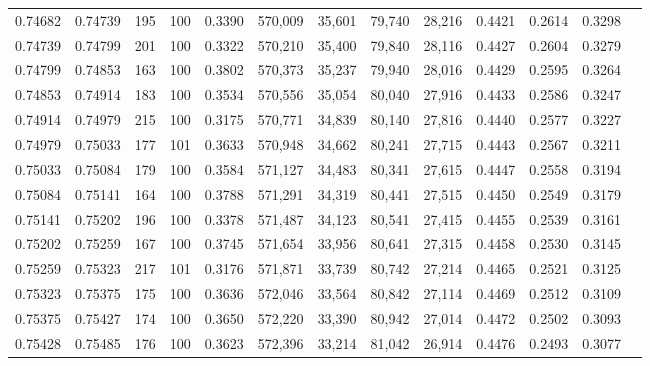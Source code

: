 \begin{tabular}{rrrrrrrrrrrrr}
0.74682 & 0.74739 &   195 & 100 &                                     0.3390 & 570,009 &  35,601 &  79,740 &  28,216 & 0.4421 & 0.2614 & 0.3298 \\
0.74739 & 0.74799 &   201 & 100 &                                     0.3322 & 570,210 &  35,400 &  79,840 &  28,116 & 0.4427 & 0.2604 & 0.3279 \\
0.74799 & 0.74853 &   163 & 100 &                                     0.3802 & 570,373 &  35,237 &  79,940 &  28,016 & 0.4429 & 0.2595 & 0.3264 \\
0.74853 & 0.74914 &   183 & 100 &                                     0.3534 & 570,556 &  35,054 &  80,040 &  27,916 & 0.4433 & 0.2586 & 0.3247 \\
0.74914 & 0.74979 &   215 & 100 &                                     0.3175 & 570,771 &  34,839 &  80,140 &  27,816 & 0.4440 & 0.2577 & 0.3227 \\
0.74979 & 0.75033 &   177 & 101 &                                     0.3633 & 570,948 &  34,662 &  80,241 &  27,715 & 0.4443 & 0.2567 & 0.3211 \\
0.75033 & 0.75084 &   179 & 100 &                                     0.3584 & 571,127 &  34,483 &  80,341 &  27,615 & 0.4447 & 0.2558 & 0.3194 \\
0.75084 & 0.75141 &   164 & 100 &                                     0.3788 & 571,291 &  34,319 &  80,441 &  27,515 & 0.4450 & 0.2549 & 0.3179 \\
0.75141 & 0.75202 &   196 & 100 &                                     0.3378 & 571,487 &  34,123 &  80,541 &  27,415 & 0.4455 & 0.2539 & 0.3161 \\
0.75202 & 0.75259 &   167 & 100 &                                     0.3745 & 571,654 &  33,956 &  80,641 &  27,315 & 0.4458 & 0.2530 & 0.3145 \\
0.75259 & 0.75323 &   217 & 101 &                                     0.3176 & 571,871 &  33,739 &  80,742 &  27,214 & 0.4465 & 0.2521 & 0.3125 \\
0.75323 & 0.75375 &   175 & 100 &                                     0.3636 & 572,046 &  33,564 &  80,842 &  27,114 & 0.4469 & 0.2512 & 0.3109 \\
0.75375 & 0.75427 &   174 & 100 &                                     0.3650 & 572,220 &  33,390 &  80,942 &  27,014 & 0.4472 & 0.2502 & 0.3093 \\
0.75428 & 0.75485 &   176 & 100 &                                     0.3623 & 572,396 &  33,214 &  81,042 &  26,914 & 0.4476 & 0.2493 & 0.3077 \\

\end{tabular}
